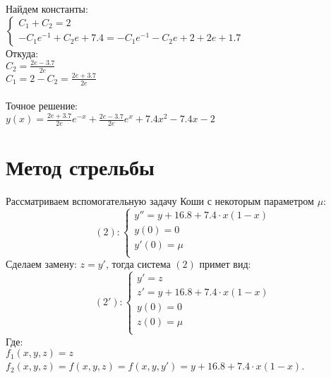 \documentclass[12pt,a4paper]{article}
\begin{document}
        \noindent
        Найдем константы:\\
        $\begin{cases}
	        C_{1} + C_{2} = 2\\
    	    -C_{1}e^{-1} + C_{2}e + 7.4 = -C_{1}e^{-1} - C_{2}e + 2 + 2e + 1.7
        \end{cases}$\\
        
        \vspace{2mm}
        \noindent
        Откуда:\\
        $C_{2} = \frac{2e - 3.7}{2e}$\\
        $C_{1} = 2 - C_{2} = \frac{2e + 3.7}{2e}$\\\\
        
        \noindent
        Точное решение:\\
        $y(x) = \frac{2e + 3.7}{2e}e^{-x} + \frac{2e - 3.7}{2e}e^{x} 
        + 7.4x^{2} - 7.4x - 2$
    
    \newpage
    \section*{Метод стрельбы}
        Рассматриваем вспомогательную задачу Коши с некоторым параметром $\mu$:\\
        \[
        (2):
        \begin{cases}
        	y'' = y + 16.8 + 7.4 \cdot x(1 - x)\\
	        y(0) = 0\\
    	    y'(0) = \mu\\
        \end{cases}
        \]
        Сделаем замену: $z = y'$, тогда система $(2)$ примет вид:\\
        \[
        (2'):
        \begin{cases}
        	y' = z\\
        	z' = y + 16.8 + 7.4 \cdot x(1 - x)\\
        	y(0) = 0\\
        	z(0) = \mu\\
        \end{cases}
        \]
        Где:\\
        $f_{1}(x, y, z) = z$\\
        $f_{2}(x, y, z) = f(x, y, z) = f(x, y, y') = y + 16.8 + 7.4 \cdot x(1 - x)$.\\\\
        
\end{document}
